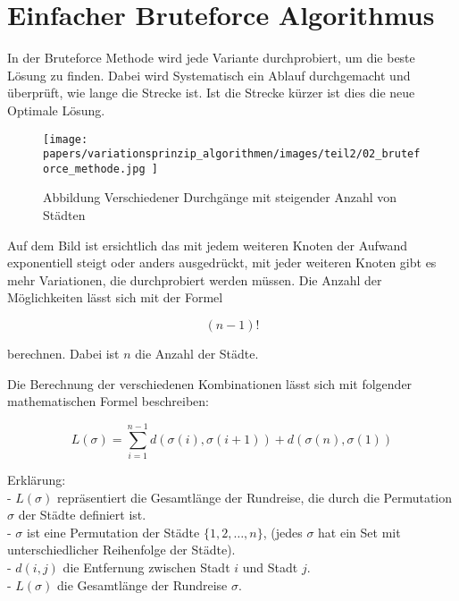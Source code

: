 %
%
%
%
\section{Einfacher Bruteforce Algorithmus}
In der Bruteforce Methode wird jede Variante durchprobiert, 
um die beste Lösung zu finden. Dabei wird Systematisch ein 
Ablauf durchgemacht und überprüft, wie lange die Strecke ist.
Ist die Strecke kürzer ist dies die neue Optimale Lösung.

\begin{figure} [h]
	\centering
	\texttt{[image: 
        papers/variationsprinzip\_algorithmen/images/teil2/02\_bruteforce\_methode.jpg
        ]}
	\caption{Abbildung Verschiedener Durchgänge mit steigender Anzahl von Städten}
	\label{fig:Abbildung Verschiedener Durchgänge mit steigender Anzahl von Städten}
\end{figure}

Auf dem Bild ist ersichtlich das mit jedem weiteren Knoten der Aufwand 
exponentiell steigt oder anders ausgedrückt, mit jeder weiteren Knoten
gibt es mehr Variationen, die durchprobiert werden müssen. Die Anzahl 
der Möglichkeiten lässt sich mit der Formel

\begin{equation}
    (n-1)!
\end{equation}

berechnen. Dabei ist \(n\) die Anzahl der Städte.

Die Berechnung der verschiedenen Kombinationen lässt sich mit folgender 
mathematischen Formel beschreiben:

\begin{equation}
    \label{eq:bruteforce_min_formula}
    L(\sigma) = \sum_{i=1}^{n-1} d(\sigma(i), \sigma(i+1)) + d(\sigma(n), \sigma(1))
\end{equation}

Erklärung:\\
- \( L(\sigma) \)  repräsentiert die Gesamtlänge der Rundreise, die durch 
die Permutation \( \sigma \) der Städte definiert ist.\\
- \( \sigma \) ist eine Permutation der Städte \( \{1, 2, \ldots, n\} \),
 (jedes \( \sigma \) hat ein Set mit unterschiedlicher Reihenfolge der Städte).\\
- \( d(i, j) \) die Entfernung zwischen Stadt \( i \) und Stadt \( j \).\\
- \( L(\sigma) \) die Gesamtlänge der Rundreise \( \sigma \).\\

